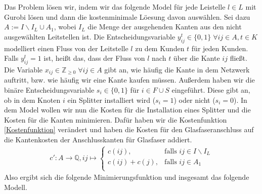\documentclass[11pt,a4paper]{article}
\newcommand{\Z}{\mathbb{Z}}
\newcommand{\Q}{\mathbb{Q}}
\theoremstyle{my_th_style1}
\begin{document}
Das Problem lösen wir, indem wir das folgende Model für jede Leistelle $l \in L $ mit Gurobi lösen
 und dann die kostenminimale L\"oesung davon ausw\"ahlen. Sei dazu $A:= I\backslash I_L \cup A_1$, wobei $I_L$ die Menge der ausgehenden Kanten aus den nicht ausgewählten Leitstellen ist.
Die Entscheidungsvariable $y_{ij}^t \in \{0,1\}\; \forall ij \in A, t \in K$ modelliert einen Fluss von der Leitstelle $l$ zu dem Kunden $t$ für jeden Kunden. Falls $y_{ij}^t=1$ ist, heißt das, dass der Fluss von $l$ nach $t$ über die Kante $ij$ fließt.
Die Variable $x_{ij} \in \Z_{\geq 0} \; \forall ij \in A $ gibt an, wie häufig die Kante in dem Netzwerk auftritt, bzw. wie häufig wir eine Kante kaufen müssen. Außerdem haben wir die binäre Entscheidungsvariable $s_i \in \{0,1\}$ für $i \in F \cup S$ eingeführt. Diese gibt an, ob in dem Knoten $i$ ein Splitter installiert wird ($s_i=1$) oder nicht ($s_i=0$). In dem Model wollen wir nun die Kosten für die Installation eines Splitter und die Kosten für die Kanten minimieren. Daf\"ur haben wir die Kostenfunktion \eqref{Kostenfunktion} ver\"andert und haben die Kosten für den Glasfaseranschluss auf die Kantenkosten der Anschlusskanten für Glasfaser addiert.
\begin{align}
\label{KostenfunktionP2MP}
c': A \rightarrow \Q, ij  \mapsto \left\{\begin{array}{cl} 
c(ij), & \text{falls } ij \in I\backslash I_L\\ 
c(ij)+c(j), & \text{falls } ij \in A_1\\ 
\end{array}
\right.
\end{align}
Also ergibt sich die folgende Minimierungsfunktion und insgesamt das folgende Modell.
\end{document}
